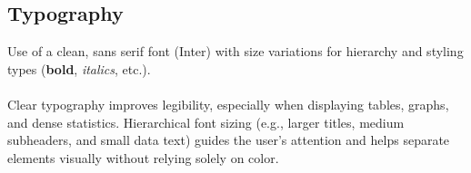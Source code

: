 \documentclass{article}
\begin{document}
\subsection{Typography}

Use of a clean, sans serif font (Inter) with size variations for hierarchy and styling types (\textbf{bold}, \textit{italics}, etc.).
\\
\\
Clear typography improves legibility, especially when displaying tables, graphs, and dense statistics. Hierarchical font sizing (e.g., larger titles, medium subheaders, and small data text) guides the user's attention and helps separate elements visually without relying solely on color.
\end{document}
